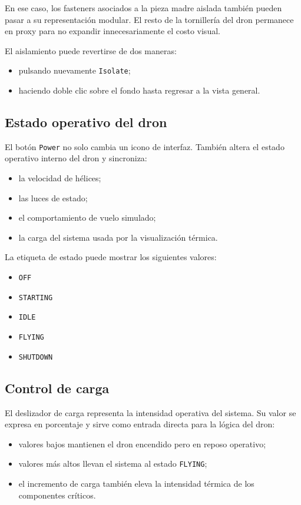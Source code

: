 \documentclass[12pt,letterpaper]{article}
\begin{document}
\noindent En ese caso, los fasteners asociados a la pieza madre aislada también pueden pasar a su representación modular. El resto de la tornillería del dron permanece en proxy para no expandir innecesariamente el costo visual.

El aislamiento puede revertirse de dos maneras:
\begin{itemize}
    \item pulsando nuevamente \texttt{Isolate};
    \item haciendo doble clic sobre el fondo hasta regresar a la vista general.
\end{itemize}

\subsection{Estado operativo del dron}
El botón \texttt{Power} no solo cambia un icono de interfaz. También altera el estado operativo interno del dron y sincroniza:
\begin{itemize}
    \item la velocidad de hélices;
    \item las luces de estado;
    \item el comportamiento de vuelo simulado;
    \item la carga del sistema usada por la visualización térmica.
\end{itemize}

\noindent La etiqueta de estado puede mostrar los siguientes valores:
\begin{itemize}
    \item \texttt{OFF}
    \item \texttt{STARTING}
    \item \texttt{IDLE}
    \item \texttt{FLYING}
    \item \texttt{SHUTDOWN}
\end{itemize}

\subsection{Control de carga}
El deslizador de carga representa la intensidad operativa del sistema. Su valor se expresa en porcentaje y sirve como entrada directa para la lógica del dron:
\begin{itemize}
    \item valores bajos mantienen el dron encendido pero en reposo operativo;
    \item valores más altos llevan el sistema al estado \texttt{FLYING};
    \item el incremento de carga también eleva la intensidad térmica de los componentes críticos.
\end{itemize}
\end{document}
